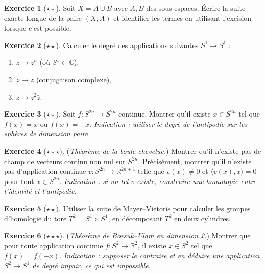 \documentclass[12pt,a4paper,openany]{book}
\theoremstyle{definition}
\newtheorem{exercice}{Exercice}[chapter]
\theoremstyle{plain}
\theoremstyle{remark}
\newcommand{\R}{\mathbb{R}}
\newcommand{\C}{\mathbb{C}}
\begin{document}
\begin{exercice}[$\star\star$]\label{exo:suite-exacte-triade}
Soit $X = A \cup B$ avec $A, B$ des sous-espaces. Écrire la suite exacte longue de la paire
$(X, A)$ et identifier les termes en utilisant l'excision lorsque c'est possible.
\end{exercice}

\begin{exercice}[$\star\star$]\label{exo:degre-calculs}
Calculer le degré des applications suivantes $S^1 \to S^1$ :
\begin{enumerate}[label=(\alph*)]
  \item $z \mapsto z^n$ (où $S^1 \subset \C$),
  \item $z \mapsto \bar{z}$ (conjugaison complexe),
  \item $z \mapsto z^2 \bar{z}$.
\end{enumerate}
\end{exercice}

\begin{exercice}[$\star\star$]\label{exo:brouwer-consequence}
Soit $f \colon S^{2n} \to S^{2n}$ continue. Montrer qu'il existe $x \in S^{2n}$ tel que
$f(x) = x$ ou $f(x) = -x$.
\emph{Indication : utiliser le degré de l'antipodie sur les sphères de dimension paire.}
\end{exercice}

\begin{exercice}[$\star\star\star$]\label{exo:hairy-ball}
(\emph{Théorème de la boule chevelue.}) Montrer qu'il n'existe pas de champ de vecteurs continu
non nul sur $S^{2n}$. Précisément, montrer qu'il n'existe pas d'application continue
$v \colon S^{2n} \to \R^{2n+1}$ telle que $v(x) \neq 0$ et $\langle v(x), x \rangle = 0$
pour tout $x \in S^{2n}$.
\emph{Indication : si un tel $v$ existe, construire une homotopie entre l'identité et
l'antipodie.}
\end{exercice}

\begin{exercice}[$\star\star$]\label{exo:suite-mv-calcul}
Utiliser la suite de Mayer--Vietoris pour calculer les groupes d'homologie du tore
$T^2 = S^1 \times S^1$, en décomposant $T^2$ en deux cylindres.
\end{exercice}

\begin{exercice}[$\star\star\star$]\label{exo:borsuk-ulam-dim2}
(\emph{Théorème de Borsuk--Ulam en dimension 2.})
Montrer que pour toute application continue $f \colon S^2 \to \R^2$, il existe $x \in S^2$ tel
que $f(x) = f(-x)$.
\emph{Indication : supposer le contraire et en déduire une application $S^2 \to S^1$ de degré
impair, ce qui est impossible.}
\end{exercice}
\end{document}
